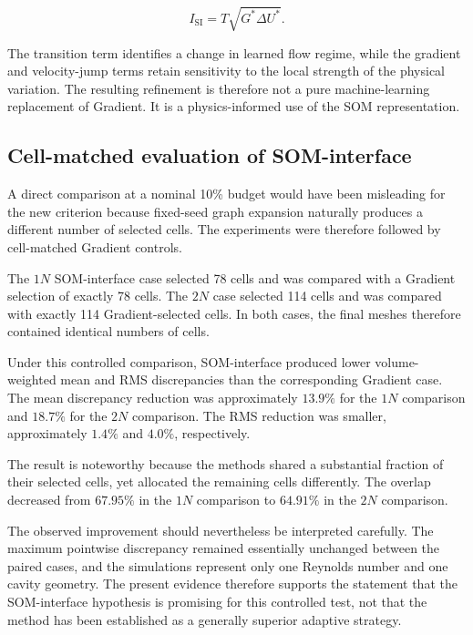 \begin{equation}
I_{\mathrm{SI}}
=
T\sqrt{G^*\Delta U^*}.
\end{equation}

The transition term identifies a change in learned flow regime, while the
gradient and velocity-jump terms retain sensitivity to the local strength of
the physical variation. The resulting refinement is therefore not a pure
machine-learning replacement of Gradient. It is a physics-informed use of
the SOM representation.

\subsection{Cell-matched evaluation of SOM-interface}

A direct comparison at a nominal 10\% budget would have been misleading for
the new criterion because fixed-seed graph expansion naturally produces a
different number of selected cells. The experiments were therefore followed
by cell-matched Gradient controls.

The \(1N\) SOM-interface case selected 78 cells and was compared with a
Gradient selection of exactly 78 cells. The \(2N\) case selected 114 cells
and was compared with exactly 114 Gradient-selected cells. In both cases,
the final meshes therefore contained identical numbers of cells.

Under this controlled comparison, SOM-interface produced lower
volume-weighted mean and RMS discrepancies than the corresponding Gradient
case. The mean discrepancy reduction was approximately \(13.9\%\) for the
\(1N\) comparison and \(18.7\%\) for the \(2N\) comparison. The RMS reduction
was smaller, approximately \(1.4\%\) and \(4.0\%\), respectively.

The result is noteworthy because the methods shared a substantial fraction
of their selected cells, yet allocated the remaining cells differently.
The overlap decreased from \(67.95\%\) in the \(1N\) comparison to \(64.91\%\)
in the \(2N\) comparison.

The observed improvement should nevertheless be interpreted carefully. The
maximum pointwise discrepancy remained essentially unchanged between the
paired cases, and the simulations represent only one Reynolds number and
one cavity geometry. The present evidence therefore supports the statement
that the SOM-interface hypothesis is promising for this controlled test,
not that the method has been established as a generally superior adaptive
strategy.

